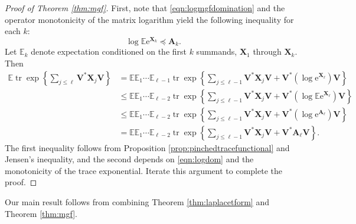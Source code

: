 \documentclass[11pt,letterpaper,twoside,reqno,nosumlimits]{amsart}
\renewcommand{\star}{*}
\newcommand{\mat}[1]{\ensuremath{\bm{#1}}} %
\newcommand{\e}{\ensuremath{\mathrm{e}}}
\newcommand{\E}{\ensuremath{\mathbb{E}}}
\DeclareMathOperator{\tr}{tr}
\newcommand{\trexp}[1]{\ensuremath{\tr\exp\left\{#1\right\}}}
\theoremstyle{remark}
\numberwithin{equation}{section}
\numberwithin{thm}{section}
\numberwithin{prop}{section}
\numberwithin{defn}{section}
\numberwithin{remark}{section}
\begin{document}
\begin{proof}[Proof of Theorem \ref{thm:mgf}]
 First, note that \eqref{eqn:logmgfdomination} and the operator monotonicity of the matrix logarithm yield the following inequality for each $k$: 
\begin{equation}
\log \E \e^{\mat{X}_k} \preceq \mat{A}_k.
\label{eqn:logdom}
\end{equation}
Let $\E_k$ denote expectation conditioned on the first $k$ summands, $\mat{X}_1$ through $\mat{X}_k.$ Then
\begin{align*}
 \E \trexp{\sum_{j \leq \ell} \mat{V}^\star \mat{X}_j \mat{V}} & = \E\E_1\cdots \E_{\ell-1} \trexp{\sum_{j \leq \ell-1} \mat{V}^\star \mat{X}_j \mat{V} + \mat{V}^\star \left( \log \e^{\mat{X}_\ell} \right) \mat{V}} \\
 & \leq \E\E_1\cdots \E_{\ell-2} \trexp{\sum_{j \leq \ell-1} \mat{V}^\star \mat{X}_j \mat{V} + \mat{V}^\star \left( \log\E\e^{\mat{X}_\ell} \right) \mat{V}} \\
 & \leq \E\E_1\cdots \E_{\ell-2} \trexp{\sum_{j \leq \ell-1} \mat{V}^\star \mat{X}_j \mat{V} + \mat{V}^\star \left( \log\e^{\mat{A}_\ell} \right) \mat{V} } \\
 & = \E\E_1\cdots \E_{\ell-2} \trexp{\sum_{j \leq \ell-1} \mat{V}^\star \mat{X}_j \mat{V} + \mat{V}^\star \mat{A}_\ell \mat{V} }.
\end{align*}
The first inequality follows from Proposition \ref{prop:pinchedtracefunctional} and Jensen's inequality, and the second depends on \eqref{eqn:logdom} and the monotonicity of the trace exponential. Iterate this argument to complete the proof.
\end{proof}


Our main result follows from combining Theorem \ref{thm:laplacetform} and Theorem \ref{thm:mgf}.
\end{document}

